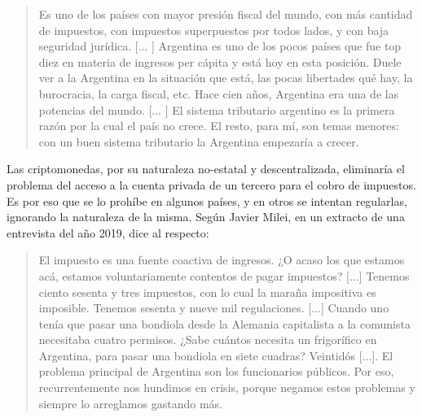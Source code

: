\documentclass[12pt,a4paper,twoside]{book}
\begin{document}
\begin{quotation}
Es uno de los países con mayor presión fiscal del mundo, con más cantidad de impuestos, con impuestos superpuestos por todos lados, y con baja seguridad jurídica. [... ] Argentina es uno de los pocos países que fue top diez en materia de ingresos per cápita y está hoy en esta posición. Duele ver a la Argentina en la situación que está, las pocas libertades qué hay, la burocracia, la carga fiscal, etc. Hace cien años, Argentina era una de las potencias del mundo. [... ] El sistema tributario argentino es la primera razón por la cual el país no crece. El resto, para mí, son temas menores: con un buen sistema tributario la Argentina empezaría a crecer. \cite{litwak}
\end{quotation}

Las criptomonedas, por su naturaleza no-estatal y descentralizada, eliminaría el problema del acceso a la cuenta privada de un tercero para el cobro de impuestos. Es por eso que se lo prohíbe en algunos países, y en otros se intentan regularlas, ignorando la naturaleza de la misma. Según Javier Milei, en un extracto de una entrevista del año 2019, dice al respecto:

\begin{quotation}
El impuesto es una fuente coactiva de ingresos. ¿O acaso los que estamos acá, estamos voluntariamente contentos de pagar impuestos? [...] Tenemos ciento sesenta y tres impuestos, con lo cual la maraña impositiva es imposible. Tenemos sesenta y nueve mil regulaciones. [...] Cuando uno tenía que pasar una bondiola desde la Alemania capitalista a la comunista necesitaba cuatro permisos. ¿Sabe cuántos necesita un frigorífico en Argentina, para pasar una bondiola en siete cuadras? Veintidós [...]. El problema principal de Argentina son los funcionarios públicos. Por eso, recurrentemente nos hundimos en crisis, porque negamos estos problemas y siempre lo arreglamos gastando más. \cite{milei:intransigente}
\end{quotation}
\end{document}
